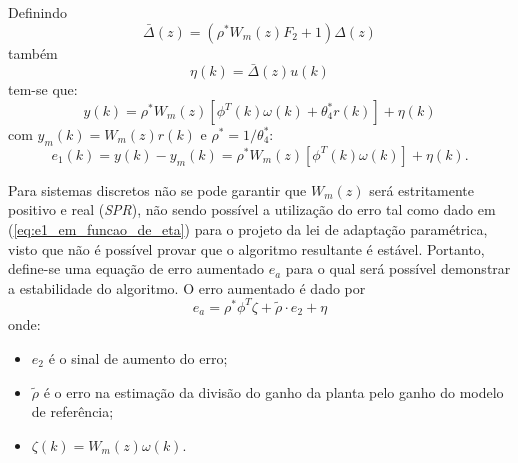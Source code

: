     Definindo
    \begin{equation*}
        \bar{\Delta}(z) = \left( \rho^* W_m(z) F_2 + 1 \right) \Delta(z)
    \end{equation*}
    também
    \begin{equation*}
        \eta(k) = \bar{\Delta}(z) u(k)
    \end{equation*}
    tem-se que:
    \begin{equation*}
        y(k) = \rho^* W_m(z) \left[ \phi^T(k) \omega(k) + \theta_4^* r(k)
            \right] + \eta(k)
    \end{equation*}
    com $y_m(k) = W_m(z) r(k)$ e $\rho^* = 1/\theta_4^*$:
    \begin{equation}
        e_1(k) = y(k) - y_m(k) = \rho^* W_m(z) \left[ \phi^T(k) \omega(k) \right] + \eta(k) \text{.}
        \label{eq:e1_em_funcao_de_eta}
    \end{equation}

    Para sistemas discretos não se pode garantir que $W_m(z)$ será estritamente positivo e real (\emph{SPR}), não sendo possível a utilização do erro tal como dado em (\ref{eq:e1_em_funcao_de_eta}) para o projeto da lei de adaptação paramétrica, visto que não é possível provar que o algoritmo resultante é estável. Portanto, define-se uma equação de erro aumentado $e_a$ para o qual será possível demonstrar a estabilidade do algoritmo. O erro aumentado é dado por
    \begin{equation}
        e_a = \rho^* \phi^T \zeta + \tilde{\rho} \cdot e_2 + \eta
        \label{eq:ea_erro_aumentado}
    \end{equation}
    onde:
    \begin{itemize}[leftmargin=+2cm]
        \item[] $e_2$ é o sinal de aumento do erro;
        \item[] $\tilde{\rho}$ é o erro na estimação da divisão do ganho da planta pelo ganho do modelo de referência;
        \item[] $\zeta(k) = W_m(z) \omega(k) \text{.}$
    \end{itemize}

